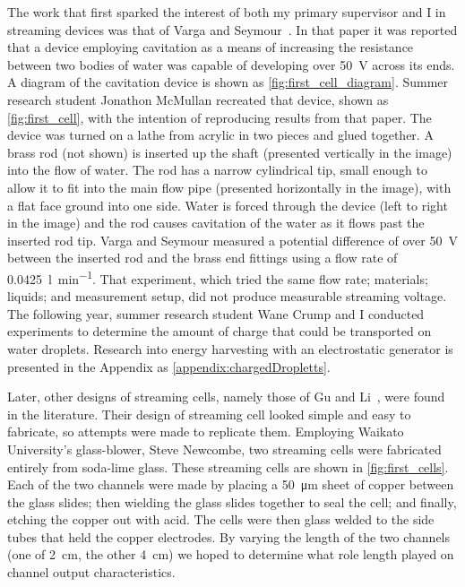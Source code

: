     The work that first sparked the interest of both my primary supervisor and I in streaming devices was that of Varga and Seymour~\cite{Varga1986}.
    In that paper it was reported that a device employing cavitation as a means of increasing the resistance between two bodies of  water was capable of developing over \SI{50}{\volt} across its ends.
    A diagram of the cavitation device is shown as \cref{fig:first_cell_diagram}.
    Summer research student Jonathon McMullan recreated that device, shown as \cref{fig:first_cell}, with the intention of reproducing results from that paper.
    The device was turned on a lathe from acrylic in two pieces and glued together.
    A brass rod (not shown) is inserted up the shaft (presented vertically in the image) into the flow of water.
    The rod has a narrow cylindrical tip, small enough to allow it to fit into the main flow pipe (presented horizontally in the image), with a flat face ground into one side.
    Water is forced through the device (left to right in the image) and the rod causes cavitation of the water as it flows past the inserted rod tip.
    Varga and Seymour measured a potential difference of over \SI{50}{\volt} between the inserted rod and the brass end fittings using a flow rate of \SI{0.0425}{\litre\per\minute}.
    That experiment, which tried the same flow rate; materials; liquids; and measurement setup, did not produce measurable streaming voltage.
    The following year, summer research student Wane Crump and I conducted experiments to determine the amount of charge that could be transported on water droplets.
    Research into energy harvesting with an electrostatic generator is presented in the Appendix as \cref{appendix:chargedDropletts}.

    Later, other designs of streaming cells, namely those of Gu and Li~\cite{Gu2000}, were found in the literature.
    Their design of streaming cell looked simple and easy to fabricate, so attempts were made to replicate them.
    Employing Waikato University's glass-blower, Steve Newcombe, two streaming cells were fabricated entirely from soda-lime glass.
    These streaming cells are shown in \cref{fig:first_cells}.
    Each of the two channels were made by placing a \SI{50}{\micro\meter} sheet of copper between the glass slides; then wielding the glass slides together to seal the cell; and finally, etching the copper out with acid.
    The cells were then glass welded to the side tubes that held the copper electrodes.
    By varying the length of the two channels (one of \SI{2}{\centi\meter}, the other \SI{4}{\centi\meter}) we hoped to determine what role length played on channel output characteristics.

